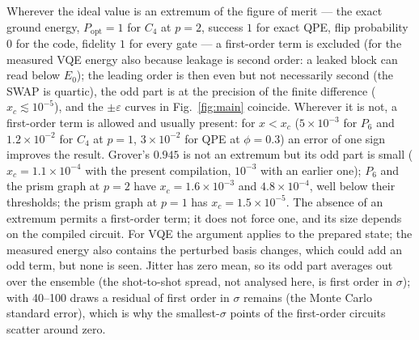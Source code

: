 \documentclass[reprint,aps,pra,amsmath,amssymb,superscriptaddress,letterpaper]{revtex4-2}
\newcommand{\Popt}{P_{\mathrm{opt}}}
\begin{document}
Wherever the ideal value is an extremum of the figure of merit --- the exact
ground energy, $\Popt=1$ for $C_4$ at $p=2$, success $1$ for exact QPE, flip
probability $0$ for the code, fidelity $1$ for every gate --- a first-order term is excluded (for the measured VQE energy also because leakage is second order: a leaked block can read below $E_0$); the leading order is then even but not necessarily second
(the SWAP is quartic), the odd part is at the precision of the finite
difference ($x_c\lesssim10^{-5}$), and the $\pm\varepsilon$ curves in
Fig.~\ref{fig:main} coincide. Wherever it is not, a first-order term is
allowed and usually present: for $x<x_c$ ($5\times10^{-3}$ for $P_6$ and
$1.2\times10^{-2}$ for $C_4$ at $p=1$, $3\times10^{-2}$ for QPE at $\phi=0.3$) an
error of one sign improves the result. Grover's $0.945$ is not an extremum
but its odd part is small ($x_c=1.1\times10^{-4}$ with the present
compilation, $10^{-3}$ with an earlier one); $P_6$ and the prism graph at $p=2$
have $x_c=1.6\times10^{-3}$ and $4.8\times10^{-4}$, well below their
thresholds; the prism graph at $p=1$ has $x_c=1.5\times10^{-5}$. The absence
of an extremum permits a first-order term; it does not force one, and its
size depends on the compiled circuit. For VQE the argument applies to the
prepared state; the measured energy also contains the perturbed basis
changes, which could add an odd term, but none is seen. Jitter has zero mean,
so its odd part averages out over the ensemble (the shot-to-shot spread, not
analysed here, is first order in $\sigma$); with 40--100 draws a residual of first order in $\sigma$ remains (the Monte Carlo standard error), which is why the smallest-$\sigma$ points of the first-order circuits scatter around zero.
\end{document}
